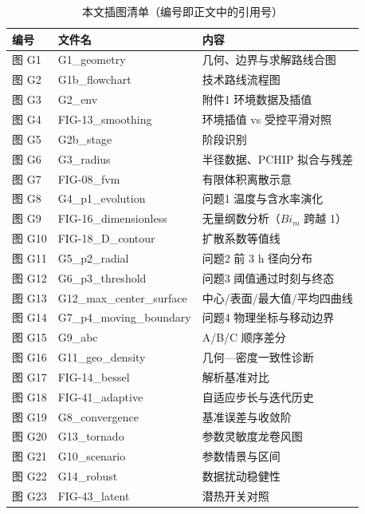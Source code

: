 \begin{table}[H]
  \centering
  \caption{本文插图清单（编号即正文中的引用号）}
  \label{tab:figlist}
  \footnotesize
  \begin{tabularx}{\textwidth}{@{}llX@{}}
    \toprule
    编号 & 文件名 & 内容 \\
    \midrule
    图 G1 & G1\_geometry & 几何、边界与求解路线合图 \\
    图 G2 & G1b\_flowchart & 技术路线流程图 \\
    图 G3 & G2\_env & 附件1 环境数据及插值 \\
    图 G4 & FIG-13\_smoothing & 环境插值 vs 受控平滑对照 \\
    图 G5 & G2b\_stage & 阶段识别 \\
    图 G6 & G3\_radius & 半径数据、PCHIP 拟合与残差 \\
    图 G7 & FIG-08\_fvm & 有限体积离散示意 \\
    图 G8 & G4\_p1\_evolution & 问题1 温度与含水率演化 \\
    图 G9 & FIG-16\_dimensionless & 无量纲数分析（$Bi_m$ 跨越 1） \\
    图 G10 & FIG-18\_D\_contour & 扩散系数等值线 \\
    图 G11 & G5\_p2\_radial & 问题2 前 3 h 径向分布 \\
    图 G12 & G6\_p3\_threshold & 问题3 阈值通过时刻与终态 \\
    图 G13 & G12\_max\_center\_surface & 中心/表面/最大值/平均四曲线 \\
    图 G14 & G7\_p4\_moving\_boundary & 问题4 物理坐标与移动边界 \\
    图 G15 & G9\_abc & A/B/C 顺序差分 \\
    图 G16 & G11\_geo\_density & 几何—密度一致性诊断 \\
    图 G17 & FIG-14\_bessel & 解析基准对比 \\
    图 G18 & FIG-41\_adaptive & 自适应步长与迭代历史 \\
    图 G19 & G8\_convergence & 基准误差与收敛阶 \\
    图 G20 & G13\_tornado & 参数灵敏度龙卷风图 \\
    图 G21 & G10\_scenario & 参数情景与区间 \\
    图 G22 & G14\_robust & 数据扰动稳健性 \\
    图 G23 & FIG-43\_latent & 潜热开关对照 \\
    \bottomrule
  \end{tabularx}
\end{table}


